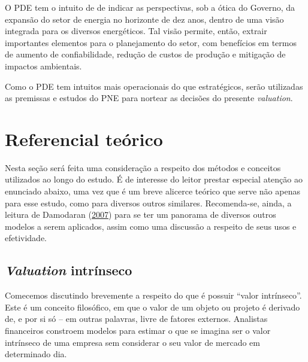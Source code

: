\documentclass[grad,numbers]{coppe}
\begin{document}
  O PDE tem o intuito de de indicar as perspectivas, sob a ótica do Governo, da expansão do setor de energia no horizonte de dez anos, dentro de uma visão integrada para os diversos energéticos. Tal visão permite, então, extrair importantes elementos para o planejamento do setor, com benefícios em termos de aumento de confiabilidade, redução de custos de produção e mitigação de impactos ambientais.

  Como o PDE tem intuitos mais operacionais do que estratégicos, serão utilizadas as premissas e estudos do PNE para nortear as decisões do presente \emph{valuation}.

  \hypertarget{referencial-teuxf3rico}{%
  \chapter{Referencial teórico}\label{referencial-teuxf3rico}}

  Nesta seção será feita uma consideração a respeito dos métodos e conceitos utilizados ao longo do estudo. É de interesse do leitor prestar especial atenção ao enunciado abaixo, uma vez que é um breve alicerce teórico que serve não apenas para esse estudo, como para diversos outros similares. Recomenda-se, ainda, a leitura de Damodaran (\protect\hyperlink{ref-damodaran2007}{2007}) para se ter um panorama de diversos outros modelos a serem aplicados, assim como uma discussão a respeito de seus usos e efetividade.

  \hypertarget{valuation-intruxednseco}{%
  \section{\texorpdfstring{\emph{Valuation} intrínseco}{Valuation intrínseco}}\label{valuation-intruxednseco}}

  Comecemos discutindo brevemente a respeito do que é possuir ``valor intrínseco''. Este é um conceito filosófico, em que o valor de um objeto ou projeto é derivado de, e por si só -- em outras palavras, livre de fatores externos. Analistas financeiros constroem modelos para estimar o que se imagina ser o valor intrínseco de uma empresa sem considerar o seu valor de mercado em determinado dia.
\end{document}
